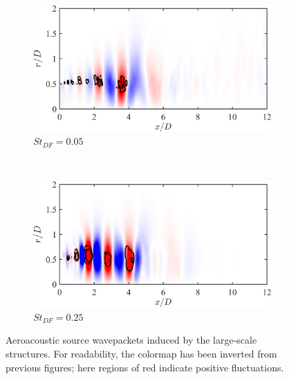 \begin{figure}
	\centering
	\begin{subfigure}{0.75\textwidth}
		\centering
		\includegraphics[width=0.95\linewidth]{Figures/ch5_St005_SL_131.png}
		\caption{$St_{DF} = 0.05$}
		\label{fig:SL_St005}
	\end{subfigure}\\
	\begin{subfigure}{0.75\textwidth}
		\centering
		\includegraphics[width=0.95\linewidth]{Figures/ch5_St025_SL_1.png}
		\caption{$St_{DF} = 0.25$}
	\end{subfigure}
	\caption{Aeroacoustic source wavepackets induced by the large-scale structures. For readability, the colormap has been inverted from previous figures; here regions of red indicate positive fluctuations.}
	\label{fig:SL}
\end{figure}

